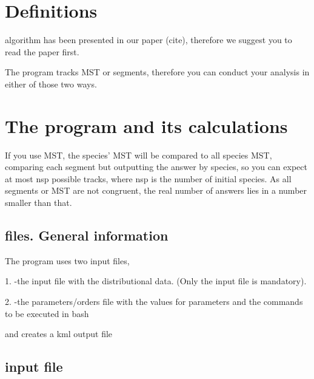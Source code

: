
\section*{Definitions}

% 
% 


\MT algorithm has been presented in our paper (cite), therefore we suggest you to read the paper first.


The program tracks MST or segments, therefore you can conduct your analysis in either of those two ways.





\section*{The program and its calculations}


If you use MST, the species' MST will be compared to all species MST, comparing each segment but outputting the answer by species, so you can expect at most nsp possible tracks, where nsp is the number of initial species. As all segments or MST are not congruent, the real number of answers lies in a number smaller than that.

\vspace{-7\baselineskip}
\vspace{7\baselineskip}
	

\subsection*{\MT files. General information}

The program uses two input files,


1. -the input file with the distributional data. (Only the input file is mandatory).
	
	
2. -the parameters/orders file with the values for parameters and the commands to be executed in bash 
	

	
and creates a kml output file


\subsection*{\MT input file}

